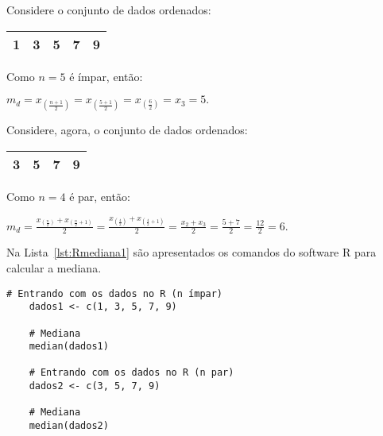 \documentclass[11pt,fleqn]{book} %
\begin{document}
\begin{example}

Considere o conjunto de dados ordenados:

\begin{center}
	\begin{tabular}{c c c c c}
	\hline
	1 & 3 & 5 & 7 & 9 \\
	\hline
	\end{tabular}
\end{center}


Como  $n=5$  é ímpar, então:

\begin{center}
$m_d= \displaystyle x_{(\frac{n+1}{2})}= x_{(\frac{5+1}{2})}= x_{(\frac{6}{2})}=x_3=5.$ 
\end{center}

\vspace{0,5cm}

\noindent Considere, agora, o conjunto de dados ordenados:

\begin{center}
	\begin{tabular}{c c c c}
	\hline
	3 & 5 & 7 & 9 \\
	\hline
	\end{tabular}
\end{center}


Como  $n=4$  é par, então:

\begin{center}
$m_d=\displaystyle \frac{x_{(\frac{n}{2})}+x_{(\frac{n}{2}+1)}}{2}=\frac{x_{(\frac{4}{2})}+x_{(\frac{4}{2}+1)}}{2}
=\frac{x_{2}+x_{3}}{2}=\frac{5+7}{2}=\frac{12}{2}=6.$
\end{center}

\end{example}

\vspace{0,3cm}

Na Lista~\ref{lst:Rmediana1} são apresentados os comandos do software R para calcular a mediana. \\

\begin{scriptsize}
	\estiloR
	\begin{lstlisting}[caption={Comandos do software R}, label=lst:Rmediana1]
	# Entrando com os dados no R (n ímpar)
	dados1 <- c(1, 3, 5, 7, 9)
	
	# Mediana
	median(dados1)
	
	# Entrando com os dados no R (n par)
	dados2 <- c(3, 5, 7, 9)
	
	# Mediana
	median(dados2)

	\end{lstlisting}
\end{scriptsize}
\end{document}
